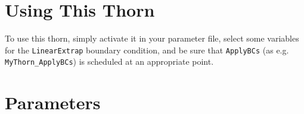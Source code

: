 \documentclass{article}
\begin{document}
\section{Using This Thorn}

To use this thorn, simply activate it in your parameter file, select
some variables for the \texttt{LinearExtrap} boundary condition, and
be sure that \texttt{ApplyBCs} (as e.g. \texttt{MyThorn\_ApplyBCs}) is
scheduled at an appropriate point.





\section{Parameters} 
\end{document}
